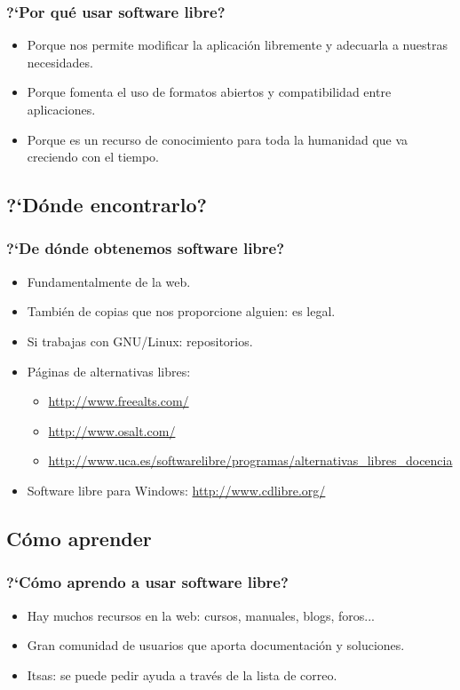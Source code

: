 \documentclass[xcolor=dvipsnames]{beamer}    %
\begin{document}
\begin{frame}
 \frametitle{?`Por qu\'e usar software libre?}
 \begin{itemize}
\item Porque nos permite modificar la aplicaci\'on libremente y adecuarla a
nuestras necesidades.
\item Porque fomenta el uso de formatos abiertos y compatibilidad entre
aplicaciones.
\item Porque es un recurso de conocimiento para toda la humanidad que va
creciendo con el tiempo.
 \end{itemize}

\end{frame}

\subsection{?`D\'onde encontrarlo?}
\begin{frame}
 \frametitle{?`De d\'onde obtenemos software libre?}
 \begin{itemize}
\item Fundamentalmente de la web.
\item Tambi\'en de copias que nos proporcione alguien: es legal.
\item Si trabajas con GNU/Linux: repositorios.
\item P\'aginas de alternativas libres:
\begin{itemize}
\item \url{http://www.freealts.com/}
\item \url{http://www.osalt.com/}
\item
\begin{scriptsize}\url{
http://www.uca.es/softwarelibre/programas/alternativas_libres_docencia}        
\end{scriptsize}
 \end{itemize}
 \item Software libre para Windows: \url{http://www.cdlibre.org/}
\end{itemize}
\end{frame}

\subsection{C\'omo aprender}
\begin{frame}
 \frametitle{?`C\'omo aprendo a usar software libre?}
 \begin{itemize}
\item Hay muchos recursos en la web: cursos, manuales, blogs, foros...
\item Gran comunidad de usuarios que aporta documentaci\'on y soluciones.
\item Itsas: se puede pedir ayuda a trav\'es de la lista de correo.
\end{itemize}
\end{frame}
\end{document}
